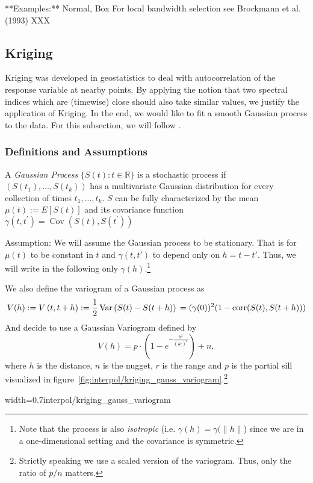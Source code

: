 **Examples:**
Normal, Box
For local bandwidth selection see Brockmann et al. (1993) XXX


\subsection{Kriging}
\label{sec:Kriging}

Kriging was developed in geostatistics to deal with autocorrelation of the response variable at nearby points. By applying the notion that two spectral indices which are (timewise) close should also take similar values, we justify the application of Kriging. In the end, we would like to fit a smooth Gaussian process to the data. For this subsection, we will follow \cite{diggleGaussianModelsGeostatistical2007}.

\subsubsection*{Definitions and Assumptions}

A \textit{Gaussian Process} $\{S(t) : t\in \mathbb R\} $ is a stochastic process if $(S(t_1),\dots,S(t_k))$ has a multivariate Gaussian distribution for every collection of times ${t_1, \dots , t_k}$.
$S$ can be fully characterized by the mean $\mu(t):=E[S(t)]$ and its covariance function $\gamma\left(t, t^{\prime}\right)=\operatorname{Cov}\left(S(t), S\left(t^{\prime}\right)\right)$

Assumption:
We will assume the Gaussian process to be stationary. That is for $\mu(t)$ to be constant in $t$ and $\gamma(t,t')$ to depend only on $h=t-t'$. Thus, we will write in the following only $\gamma(h)$.\footnote{Note that the process is also \textit{isotropic} (i.e. $\gamma(h)=\gamma(\|h\|$) since we are in a one-dimensional setting and the covariance is symmetric.}


We also define the variogram of a Gaussian process as
$$V(h):=V\left(t, t+h\right):=\frac{1}{2} \operatorname{Var}\left(S(t)-S(t+h)\right)\\ %
	=(\gamma(0))^2(1-\operatorname{corr}(S(t),S(t+h)))
$$
And decide to use a Gaussian Variogram defined by
$$V(h) = p \cdot\left(1-e^{-\frac{h^{2}}{\left(\frac{4}{7} r\right)^{2}}}\right)+n,$$
where $h$ is the distance, $n$ is the nugget, $r$ is the range and $p$ is the partial sill visualized in figure~\ref{fig:interpol/kriging_gauss_variogram}.\footnote{Strictly speaking we use a scaled version of the variogram. Thus, only the ratio of $p/n$ matters.}
\begin{my_figure}[h]{width=0.7\textwidth}{interpol/kriging_gauss_variogram}
	\caption{Gaussian Variogram with nugget=1, partial sill=3, range=55}
	\label{fig:interpol/kriging_gauss_variogram}
\end{my_figure}

